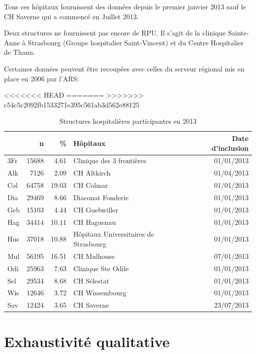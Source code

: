 \documentclass[12pt,english,french,twoside]{book}\usepackage[]{graphicx}\usepackage[]{color}
\begin{document}
Tous ces hôpitaux fournissent des données depuis le premier janvier 2013 sauf le CH Saverne qui a commencé en Juillet 2013.

Deux structures ne fournissent pas encore de RPU. Il s'agit de la clinique Sainte-Anne à Strasbourg (Groupe hospitalier Saint-Vincent) et du Centre Hospitalier de Thann.

Certaines données peuvent être recoupées avec celles du serveur régional mis en place en 2006 par l'ARS: 


<<<<<<< HEAD
=======
>>>>>>> c54c5c2092fb1533271e395c561ab3d562e88125
\begin{table}[ht]
\centering
\begin{tabular}{|l|r|r|l|r|}
  \hline
 & n & \% & Hôpitaux & Date d'inclusion \\ 
  \hline
3Fr & 15688 & 4.61 & Clinique des 3 frontières & 01/01/2013 \\ 
  Alk & 7126 & 2.09 & CH Altkirch & 01/04/2013 \\ 
  Col & 64758 & 19.03 & CH Colmar & 01/01/2013 \\ 
  Dia & 29469 & 8.66 & Diaconat Fonderie & 01/01/2013 \\ 
  Geb & 15103 & 4.44 & CH Guebwiller & 01/01/2013 \\ 
  Hag & 34414 & 10.11 & CH Haguenau & 01/01/2013 \\ 
  Hus & 37018 & 10.88 & Hôpitaux Universitaires de Strasbourg & 01/01/2013 \\ 
  Mul & 56195 & 16.51 & CH Mulhouse & 07/01/2013 \\ 
  Odi & 25963 & 7.63 & Clinique Ste Odile & 01/01/2013 \\ 
  Sel & 29534 & 8.68 & CH Sélestat & 01/01/2013 \\ 
  Wis & 12646 & 3.72 & CH Wissembourg & 01/01/2013 \\ 
  Sav & 12424 & 3.65 & CH Saverne & 23/07/2013 \\ 
   \hline
\end{tabular}
\caption{Structures hospitalières participantes en 2013} 
\label{tab1}
\end{table}



\section{Exhaustivité qualitative}
\end{document}
